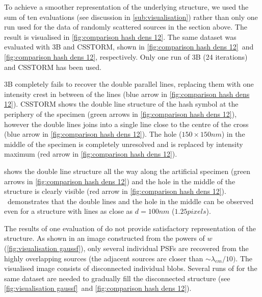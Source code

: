 To achieve a smoother representation of the underlying structure, we used the sum of ten \inmf{} evaluations (see discussion in \autoref{sub:visualisation}) rather than only one \inmf{} run used for the data of randomly scattered sources in the section above. The result is visualised in \autoref{fig:comparison hash dens 12}\bbb. The same dataset was evaluated with 3B and CSSTORM, shown in  \autoref{fig:comparison hash dens 12}\ccc\ and \autoref{fig:comparison hash dens 12}\ddd, respectively. Only one run of 3B (24 iterations) and CSSTORM has been used. 

3B completely fails to recover the double parallel lines, replacing them with one intensity crest in between of the lines (blue arrow in \autoref{fig:comparison hash dens 12}\ddd). CSSTORM shows the double line structure of the hash symbol at the periphery of the specimen (green arrows in \autoref{fig:comparison hash dens 12}\ccc), however the double lines joins into a single line close to the centre of the cross  (blue arrow in \autoref{fig:comparison hash dens 12}\ccc). The hole ($150 \times 150 \unit{nm}$) in the middle of the specimen is completely unresolved and is replaced by intensity maximum (red arrow in \autoref{fig:comparison hash dens 12}\ccc). 

\inmf{} shows the double line structure all the way along the artificial specimen (green arrows in \autoref{fig:comparison hash dens 12}\bbb) and  the hole in the middle of the structure is clearly visible (red arrow in \autoref{fig:comparison hash dens 12}\bbb). \ddd\ demonstrates that the double lines and the hole in the middle can be observed even for a structure with lines as close as $d=100\unit{nm}$ ($1.25 \unit{pixels}$). 

The results of one evaluation of \inmf{} do not provide satisfactory representation of the structure. As shown in an image constructed from the powers of $w$ (\autoref{fig:visualisation gaussf}\ccc), only several individual PSFs are recovered from the highly overlapping sources (the adjacent sources are closer than $\sim \lambda_{em}/10)$. The visualised image consists of disconnected individual blobs. Several runs of \inmf{} for the same dataset are needed to gradually fill the disconnected structure (see \autoref{fig:visualisation gaussf}\ddd\ and \ref{fig:comparison hash dens 12}\bbb).

